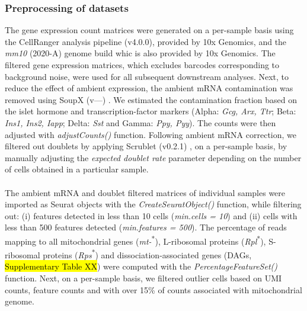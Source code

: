 \subsubsection{\large Preprocessing of datasets}
The gene expression count matrices were generated on a per-sample basis using the CellRanger analysis pipeline (v4.0.0), provided by 10x Genomics, and the \textit{mm10} (2020-A) genome build whic is also provided by 10x Genomics. The filtered gene expression matrices, which excludes barcodes corresponding to background noise, were used for all subsequent downstream analyses. Next, to reduce the effect of ambient expression, the ambient mRNA contamination was removed using SoupX (v---) \textbf{\cite{young_soupx_2020}}. We estimated the contamination fraction based on the islet hormone and transcription-factor markers (Alpha: \textit{Gcg, Arx, Ttr}; Beta: \textit{Ins1, Ins2, Iapp}; Delta: \textit{Sst} and Gamma: \textit{Ppy, Pyy}). The counts were then adjusted with \textit{adjustCounts()} function. Following ambient mRNA correction, we filtered out doublets by applying Scrublet (v0.2.1) \textbf{\cite{wolock_scrublet_2019}}, on a per-sample basis, by manually adjusting the \textit{expected doublet rate} parameter depending on the number of cells obtained in a particular sample.\\\\
The ambient mRNA and doublet filtered matrices of individual samples were imported as Seurat objects with the \textit{CreateSeuratObject()} function, while filtering out: (i) features detected in less than 10 cells (\textit{min.cells = 10}) and (ii) cells with less than 500 features detected (\textit{min.features = 500}). The percentage of reads mapping to all mitochondrial genes (\textit{mt-}\textsuperscript{*}), L-ribosomal proteins (\textit{Rpl}\textsuperscript{*}), S-ribosomal proteins (\textit{Rps}\textsuperscript{*}) and dissociation-associated genes (DAGs, \hl{Supplementary Table XX}) were computed with the \textit{PercentageFeatureSet()} function. Next, on a per-sample basis, we filtered outlier cells based on UMI counts, feature counts and  with over 15\% of counts associated with mitochondrial genome.

